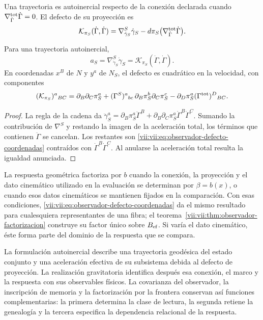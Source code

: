 \begin{definition}
\label{vii:vii:def:observador-autoinercia}
Una trayectoria es autoinercial respecto de la conexión declarada
cuando \(\nabla^{\rm tot}_{\dot\Gamma}\dot\Gamma=0\).
El defecto de su proyección es
\begin{equation}
 \mathcal K_{\pi_S}(\dot\Gamma,\dot\Gamma)
 =\nabla^S_{\dot\gamma_S}\dot\gamma_S
  -d\pi_S\bigl(\nabla^{\rm tot}_{\dot\Gamma}\dot\Gamma\bigr).
 \label{vii:vii:eq:observador-defecto-proyeccion}
\end{equation}
\end{definition}

\begin{proposition}
\label{vii:vii:prop:observador-aceleracion}
Para una trayectoria autoinercial,
\[
 a_S=\nabla^S_{\dot\gamma_S}\dot\gamma_S
     =\mathcal K_{\pi_S}(\dot\Gamma,\dot\Gamma).
\]
En coordenadas \(x^B\) de \(N\) y \(y^a\) de \(N_S\), el
defecto es cuadrático en la velocidad, con componentes
\begin{equation}
 (\mathcal K_{\pi_S})^a{}_{BC}
 =\partial_B\partial_C\pi_S^a
  +(\Gamma^S)^a{}_{bc}\,
        \partial_B\pi_S^b\partial_C\pi_S^c
  -\partial_D\pi_S^a(\Gamma^{\rm tot})^D{}_{BC}.
 \label{vii:vii:eq:observador-defecto-coordenadas}
\end{equation}
\end{proposition}

\begin{proof}
La regla de la cadena da
\(\ddot\gamma_S^a=\partial_B\pi_S^a\ddot\Gamma^B
 +\partial_B\partial_C\pi_S^a\dot\Gamma^B\dot\Gamma^C\).
Sumando la contribución de \(\nabla^S\) y restando la imagen de
la aceleración total, los términos que contienen \(\ddot\Gamma\)
se cancelan. Los restantes son
\eqref{vii:vii:eq:observador-defecto-coordenadas} contraídos con
\(\dot\Gamma^B\dot\Gamma^C\). Al anularse la aceleración total
resulta la igualdad anunciada.
\end{proof}

La respuesta geométrica factoriza por \(b\) cuando la conexión,
la proyección y el dato cinemático utilizado en la evaluación se
determinan por \(\beta=b(x)\), o cuando esos datos cinemáticos se
mantienen fijados en la comparación. Con esas condiciones,
\eqref{vii:vii:eq:observador-defecto-coordenadas} da el mismo resultado
para cualesquiera representantes de una fibra; el
teorema~\ref{vii:vii:thm:observador-factorizacion} construye su factor
único sobre \(B_{\rm ef}\). Si varía el dato cinemático, éste
forma parte del dominio de la respuesta que se compara.

La formulación autoinercial describe una trayectoria geodésica del
estado conjunto y una aceleración efectiva de su subsistema debida
al defecto de proyección. La realización gravitatoria identifica
después esa conexión, el marco y la respuesta con sus observables
físicos. La covarianza del observador, la inscripción de memoria y
la factorización por la frontera conservan así funciones complementarias:
la primera determina la clase de lectura, la segunda retiene la
genealogía y la tercera especifica la dependencia relacional de la
respuesta.
